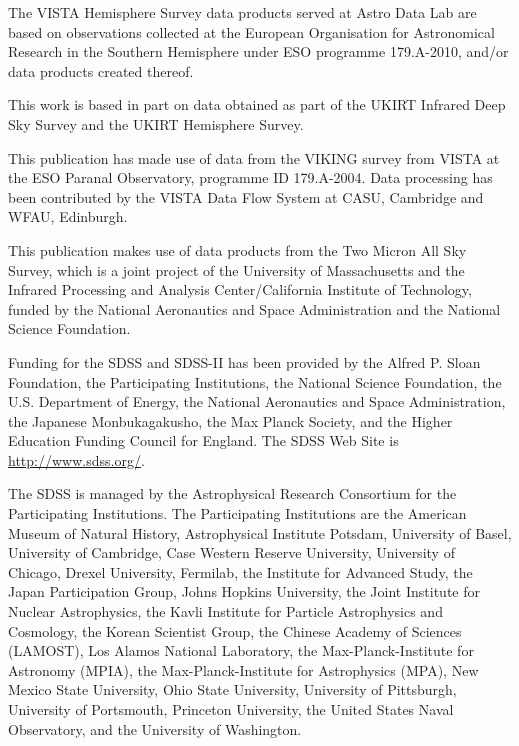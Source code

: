 \documentclass[fleqn,usenatbib]{mnras}
\begin{document}
The VISTA Hemisphere Survey data products served at Astro Data Lab are based on observations collected at the European Organisation for Astronomical Research in the Southern Hemisphere under ESO programme 179.A-2010, and/or data products created thereof.

This work is based in part on data obtained as part of the UKIRT Infrared Deep Sky Survey and the UKIRT Hemisphere Survey.

This publication has made use of data from the VIKING survey from VISTA at the ESO Paranal Observatory, programme ID 179.A-2004. Data processing has been contributed by the VISTA Data Flow System at CASU, Cambridge and WFAU, Edinburgh.

This publication makes use of data products from the Two Micron All Sky Survey, which is a joint project of the University of Massachusetts and the Infrared Processing and Analysis Center/California Institute of Technology, funded by the National Aeronautics and Space Administration and the National Science Foundation.

Funding for the SDSS and SDSS-II has been provided by the Alfred P. Sloan Foundation, the Participating Institutions, the National Science Foundation, the U.S. Department of Energy, the National Aeronautics and Space Administration, the Japanese Monbukagakusho, the Max Planck Society, and the Higher Education Funding Council for England. The SDSS Web Site is \href{http://www.sdss.org/}{http://www.sdss.org/}.

The SDSS is managed by the Astrophysical Research Consortium for the Participating Institutions. The Participating Institutions are the American Museum of Natural History, Astrophysical Institute Potsdam, University of Basel, University of Cambridge, Case Western Reserve University, University of Chicago, Drexel University, Fermilab, the Institute for Advanced Study, the Japan Participation Group, Johns Hopkins University, the Joint Institute for Nuclear Astrophysics, the Kavli Institute for Particle Astrophysics and Cosmology, the Korean Scientist Group, the Chinese Academy of Sciences (LAMOST), Los Alamos National Laboratory, the Max-Planck-Institute for Astronomy (MPIA), the Max-Planck-Institute for Astrophysics (MPA), New Mexico State University, Ohio State University, University of Pittsburgh, University of Portsmouth, Princeton University, the United States Naval Observatory, and the University of Washington.
\end{document}
